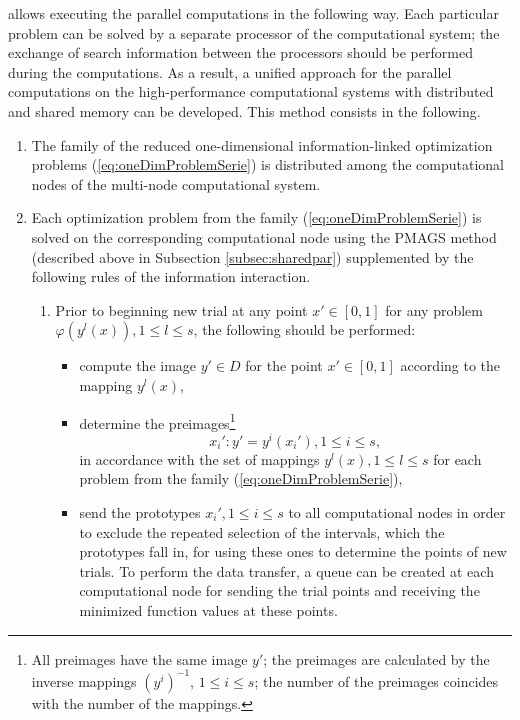 \documentclass{aims}
\theoremstyle{definition}
\begin{document}
allows executing the parallel computations in the following way. Each particular
problem can be solved by a separate processor of the computational system; the exchange
of search information between the processors should be performed during the computations.
As a result, a unified approach for the parallel computations on the high-performance
computational systems with distributed and shared memory can be developed. This method consists in the following.
\begin{enumerate}
  \item The family of the reduced one-dimensional information-linked optimization
  problems (\ref{eq:oneDimProblemSerie}) is distributed among the computational nodes of the multi-node computational system.
  \item Each optimization problem from the family (\ref{eq:oneDimProblemSerie}) is solved on the
  corresponding computational node using the PMAGS method (described above in Subsection \ref{subsec:sharedpar})
  supplemented by the following rules of the information interaction.
  \begin{enumerate}
    \item Prior to beginning new trial at any point \(x'\in [0,1]\) for any problem \(\varphi(y^l(x)),1\leq l\leq s\), the following should be performed:
    \begin{itemize}
      \item compute the image \(y'\in D\) for the point \(x'\in [0, 1]\) according to the mapping \(y^l(x)\),
      \item determine  the preimages\footnote{All preimages have the same
      image \(y'\); the preimages are calculated by the inverse mappings \((y^i)^{-1}\), \(1\le i\le s\);
      the number of the preimages coincides with the number of the mappings.}
      \begin{displaymath}
        x_i':y'=y^i(x_i'),1\le i\le s,
      \end{displaymath}
      in accordance with the set of mappings \(y^l(x), 1\le l\le s\) for each problem from the family (\ref{eq:oneDimProblemSerie}),
      \item send the prototypes \(x_i',1\leq i\leq s\) to all computational nodes in order
      to exclude the repeated selection of the intervals, which the prototypes fall in,
      for using these ones to determine the points of new trials. To perform the data transfer,
      a queue can be created at each computational node for sending the trial points and
      receiving the minimized function values at these points.

\end{itemize}
\end{enumerate}
\end{enumerate}
\end{document}
